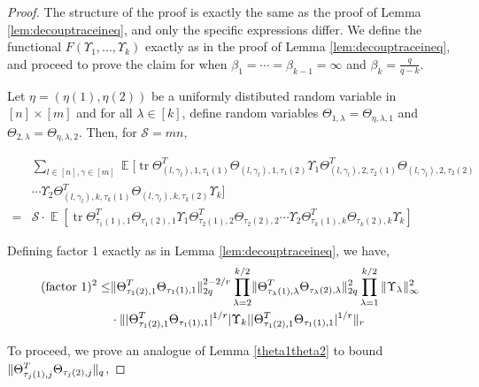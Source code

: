 \documentclass[11pt]{amsart}
\numberwithin{equation}{section}
\numberwithin{equation}{section}
\DeclareMathOperator{\E}{\mathbb{E}}
\DeclareMathOperator*{\tr}{tr}
\DeclarePairedDelimiter{\norm}{\lVert}{\rVert}
\theoremstyle{remark}
\theoremstyle{definition}
\begin{document}
\begin{proof}
    The structure of the proof is exactly the same as the proof of Lemma \ref{lem:decouptraceineq}, and only the specific expressions differ. We define the functional $F(\Upsilon_1,...,\Upsilon_k)$ exactly as in the proof of Lemma \ref{lem:decouptraceineq}, and proceed to prove the claim for when  $\beta_1= \cdots =\beta_{k-1}=\infty$ and $\beta_k=\frac{q}{q-k}$. 
    
    Let $\eta = (\eta(1), \eta(2))$ be a uniformly distibuted random variable in $[n]\times [m]$ and for all $\lambda \in [k]$, define random variables $\Theta_{1, \lambda} = \Theta_{\eta, \lambda, 1}$ and $\Theta_{2, \lambda} = \Theta_{\eta, \lambda, 2}$. Then, for $\mathcal{S} = mn$,
    
    \begin{align*}
        &\sum_{l \in [n], \gamma \in [m]} \E[ \tr \Theta_{(l,\gamma_l), 1, \tau_1(1)}^T\Theta_{(l,\gamma_l), 1, \tau_1(2)}
	\Upsilon_1\Theta_{(l,\gamma_l), 2, \tau_2(1)}^T\Theta_{(l,\gamma_l), 2, \tau_2(2)}\\&\cdots
	\Upsilon_2\Theta_{(l,\gamma_l), k, \tau_k(1)}^T\Theta_{(l,\gamma_l), k, \tau_k(2)}\Upsilon_k] \\ =
    &\mathcal{S} \cdot \E[
	\tr \Theta_{\tau_{1}(1),1}^T\Theta_{\tau_{1}(2),1}
	\Upsilon_1\Theta_{\tau_{2}(1),2}^T\Theta_{\tau_{2}(2),2}\cdots
	\Upsilon_2\Theta_{\tau_{k}(1),k}^T\Theta_{\tau_{k}(2),k}\Upsilon_k]
    \end{align*}

Defining factor 1 exactly as in Lemma \ref{lem:decouptraceineq}, we have,
\begin{align*}
(\text{factor 1})^2 \le & \norm{\Theta_{\tau_{1}(2),1}^T\Theta_{\tau_{1}(1),1}}_{2q}^{2-2/r} \prod\limits_{\lambda  = 2}^{k/2}\norm{\Theta_{\tau_{\lambda}(1),\lambda}^T\Theta_{\tau_{\lambda}(2),\lambda}}_{2q}^2\prod\limits_{\lambda  = 1}^{k/2} {\norm{\Upsilon_\lambda }_{\infty}^2} \\ &\cdot \norm{|\Theta_{\tau_{1}(2),1}^T\Theta_{\tau_{1}(1),1}|^{1/r} |\Upsilon_k| |\Theta_{\tau_{1}(2),1}^T\Theta_{\tau_{1}(1),1}|^{1/r}}_r
\end{align*}

To proceed, we prove an analogue of Lemma \ref{theta1theta2} to bound $\norm{\Theta_{\tau_j(1),j}^T\Theta_{\tau_j(2),j}}_{q}$,


\end{proof}
\end{document}
